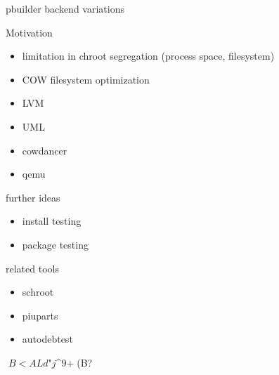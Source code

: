 \documentclass[cjk,dvipdfm,12pt]{beamer}
\begin{document}
{{{

\begin{frame}{pbuilder backend variations}
\begin{minipage}{0.5\hsize}
 Motivation
\begin{itemize}
 \item limitation in chroot segregation (process space, filesystem)
 \item COW filesystem optimization
\end{itemize}
\end{minipage}\begin{minipage}{0.4\hsize}
  \begin{itemize}
  \item LVM
  \item UML
  \item cowdancer
  \item qemu
 \end{itemize}
\end{minipage}
\end{frame}

\begin{frame}{further ideas}
 \begin{itemize}
  \item install testing
  \item package testing
 \end{itemize}
\end{frame}

\begin{frame}{related tools}
 \begin{itemize}
  \item schroot
  \item piuparts
  \item autodebtest
 \end{itemize}
\end{frame}

\begin{frame}{}
 $B<ALd$"$j$^$9$+(B?
\end{frame}


}}}
\end{document}
